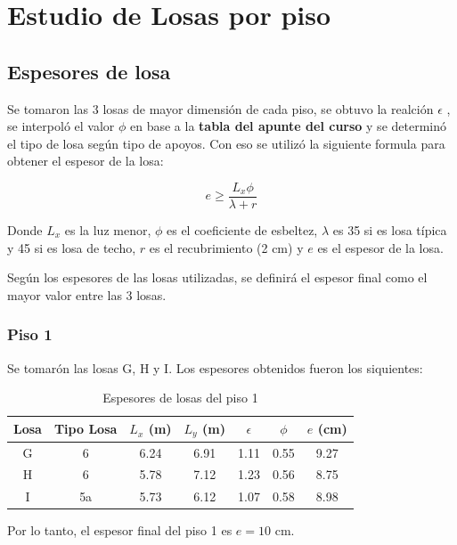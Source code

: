 \section{Estudio de Losas por piso}

\subsection{Espesores de losa}

Se tomaron las 3 losas de mayor dimensión de cada piso, se obtuvo la realción $\epsilon$
, se interpoló el valor $\phi$ en base a la \textbf{tabla del apunte del curso} y se determinó el tipo de losa según tipo de apoyos. Con eso
se utilizó la siguiente formula para obtener el espesor de la losa:

\begin{equation}
    e \ge \frac{L_x \phi}{\lambda + r}
\end{equation}

Donde $L_x$ es la luz menor, $\phi$ es el coeficiente de esbeltez, $\lambda$ es 35 si es losa típica y 45 si es losa de techo, $r$ es el recubrimiento (2 cm) y $e$ es el espesor de la losa.

Según los espesores de las losas utilizadas, se definirá el espesor final como el mayor valor entre las 3 losas.

\subsubsection{Piso 1}

Se tomarón las losas G, H y I. Los espesores obtenidos fueron los siquientes:

\begin{table}[H]
    \centering
    \begin{tabular}{|c|c|c|c|c|c|c|}
        \hline
        Losa & Tipo Losa & $L_x$ (m)& $L_y$ (m) & $\epsilon$ & $\phi$ & $e$ (cm) \\
        \hline
        G & 6 & 6.24 & 6.91 & 1.11 & 0.55 & 9.27 \\
        H & 6 & 5.78 & 7.12 & 1.23 & 0.56 & 8.75 \\
        I & 5a & 5.73 & 6.12 & 1.07 & 0.58 & 8.98 \\
        \hline
    \end{tabular}
    \caption{Espesores de losas del piso 1}
\end{table}

Por lo tanto, el espesor final del piso 1 es $e=10$ cm.

